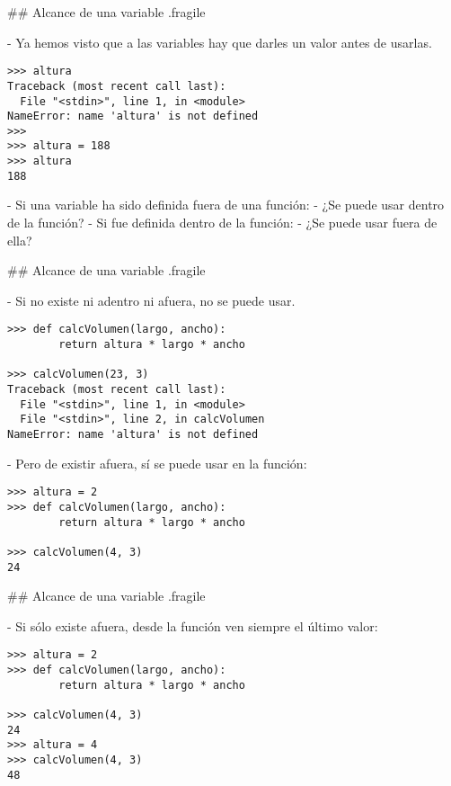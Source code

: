 ## Alcance de una variable {.fragile} 

- Ya hemos visto que a las variables hay que darles un valor antes de usarlas.

\begin{lstlisting}[style=frame02]
>>> altura
Traceback (most recent call last):
  File "<stdin>", line 1, in <module>
NameError: name 'altura' is not defined
>>>
>>> altura = 188
>>> altura
188
\end{lstlisting}

\pause

- Si una variable ha sido definida fuera de una función:
    - ¿Se puede usar dentro de la función? \newline{}
- Si fue definida dentro de la función:
    - ¿Se puede usar fuera de ella? \newline{}

\pause

## Alcance de una variable {.fragile} 

- Si no existe ni adentro ni afuera, no se puede usar.

\begin{lstlisting}[style=frame02]
>>> def calcVolumen(largo, ancho):
        return altura * largo * ancho

>>> calcVolumen(23, 3)
Traceback (most recent call last):
  File "<stdin>", line 1, in <module>
  File "<stdin>", line 2, in calcVolumen
NameError: name 'altura' is not defined
\end{lstlisting}

- Pero de existir afuera, sí se puede usar en la función:

\begin{lstlisting}[style=frame02,linebackgroundcolor={\btLstHL{1}}]
>>> altura = 2
>>> def calcVolumen(largo, ancho):
        return altura * largo * ancho

>>> calcVolumen(4, 3)
24
\end{lstlisting}

## Alcance de una variable {.fragile} 

- Si sólo existe afuera, desde la función ven siempre el último valor:

\begin{lstlisting}[style=frame02,linebackgroundcolor={\btLstHL{1,7}}]
>>> altura = 2
>>> def calcVolumen(largo, ancho):
        return altura * largo * ancho

>>> calcVolumen(4, 3)
24
>>> altura = 4
>>> calcVolumen(4, 3)
48
\end{lstlisting}

